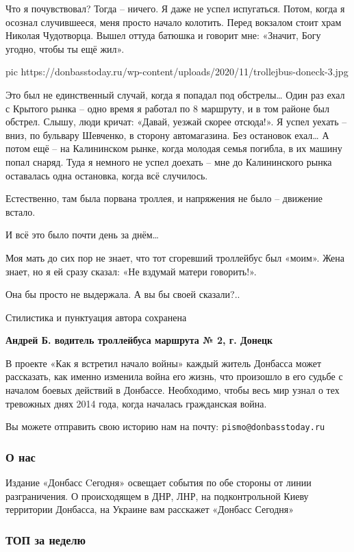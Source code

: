 Что я почувствовал? Тогда – ничего. Я даже не успел испугаться. Потом,
когда я осознал случившееся, меня просто начало колотить. Перед вокзалом
стоит храм Николая Чудотворца. Вышел оттуда батюшка и говорит мне:
«Значит, Богу угодно, чтобы ты ещё жил».

\ifcmt
pic https://donbasstoday.ru/wp-content/uploads/2020/11/trollejbus-doneck-3.jpg
\fi

Это был не единственный случай, когда я попадал под обстрелы… Один раз
ехал с Крытого рынка – одно время я работал по 8 маршруту, и в том районе
был обстрел. Слышу, люди кричат: «Давай, уезжай скорее отсюда!». Я успел
уехать – вниз, по бульвару Шевченко, в сторону автомагазина. Без остановок
ехал… А потом ещё – на Калининском рынке, когда молодая семья погибла, в
их машину попал снаряд. Туда я немного не успел доехать – мне до
Калининского рынка оставалась одна остановка, когда всё случилось.

Естественно, там была порвана троллея, и напряжения не было – движение
встало.

И всё это было почти день за днём…

Моя мать до сих пор не знает, что тот сгоревший троллейбус был «моим».
Жена знает, но я ей сразу сказал: «Не вздумай матери говорить!».

Она бы просто не выдержала. А вы бы своей сказали?..

Стилистика и пунктуация автора сохранена

\textbf{Андрей Б. водитель троллейбуса маршрута № 2, г. Донецк}

В проекте «Как я встретил начало войны» каждый житель Донбасса может
рассказать, как именно изменила война его жизнь, что произошло в его
судьбе с началом боевых действий в Донбассе. Необходимо, чтобы весь мир
узнал о тех тревожных днях 2014 года, когда началась гражданская война.

Вы можете отправить свою историю нам на почту: \verb|pismo@donbasstoday.ru|

\subsubsection{О нас}

Издание «Донбасс Cегодня» освещает события по обе стороны от линии
разграничения. О происходящем в ДНР, ЛНР, на подконтрольной Киеву территории
Донбасса, на Украине вам расскажет «Донбасс Сегодня»

\subsubsection{ТОП за неделю}

